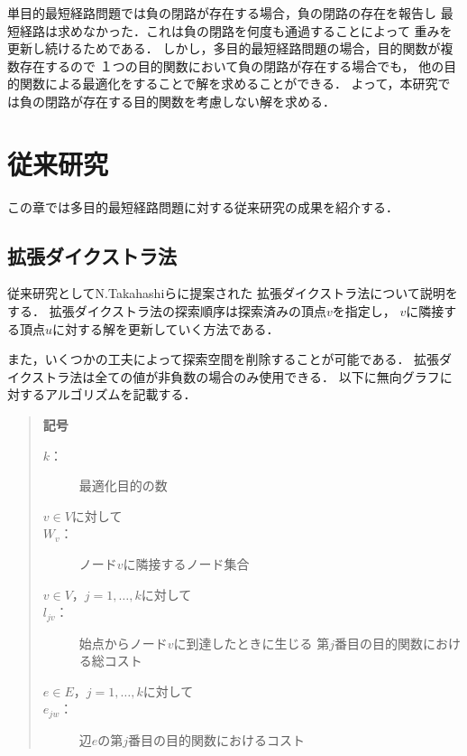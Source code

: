 \documentclass[12pt]{optlab-bachelor}
\begin{document}
単目的最短経路問題では負の閉路が存在する場合，負の閉路の存在を報告し
最短経路は求めなかった．これは負の閉路を何度も通過することによって
重みを更新し続けるためである．
しかし，多目的最短経路問題の場合，目的関数が複数存在するので
１つの目的関数において負の閉路が存在する場合でも，
他の目的関数による最適化をすることで解を求めることができる．
よって，本研究では負の閉路が存在する目的関数を考慮しない解を求める．


\chapter{従来研究}
この章では多目的最短経路問題に対する従来研究の成果を紹介する．

\section{拡張ダイクストラ法}
従来研究としてN.Takahashiら\cite{N.TAKAHASHI1}に提案された
拡張ダイクストラ法について説明をする．
拡張ダイクストラ法の探索順序は探索済みの頂点$v$を指定し，
$v$に隣接する頂点$u$に対する解を更新していく方法である．

また，いくつかの工夫によって探索空間を削除することが可能である．
拡張ダイクストラ法は全ての値が非負数の場合のみ使用できる．
以下に無向グラフに対するアルゴリズムを記載する．

\begin{quote}
  \textbf{記号}
  \begin{description}
    \item[$k$：] 最適化目的の数
    \item[$v \in V$に対して]
    \item[$W_v$：] ノード$v$に隣接するノード集合
    \item[$v \in V$，$j = 1 , \ldots , k$に対して]
    \item[$l_{jv}$：] 始点からノード$v$に到達したときに生じる
    第$j$番目の目的関数における総コスト
    \item[$e \in E$，$j = 1 , \ldots , k$に対して]
    \item[$e_{jw}$：] 辺$e$の第$j$番目の目的関数におけるコスト
  \end{description}
\end{quote}
\end{document}
